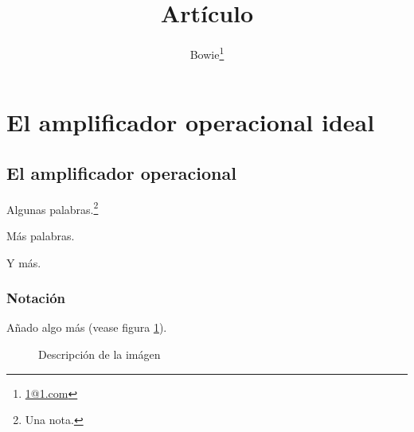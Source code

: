 \documentclass[letterpaper, 12pt]{article}
\title{Artículo}
\author{Bowie\thanks{\href{mailto:1@1.com}{1@1.com}}}
\begin{document}
\maketitle


\section{El amplificador operacional ideal}

\subsection{El amplificador operacional}

Algunas palabras.\footnote{Una nota.}

Más palabras.

Y más.

\subsubsection{Notación}

Añado algo más (vease figura \ref{fig:pasted1}).

\begin{figure}
    \label{fig:pasted1}
    \caption{Descripción de la imágen}
\end{figure}
\end{document}
